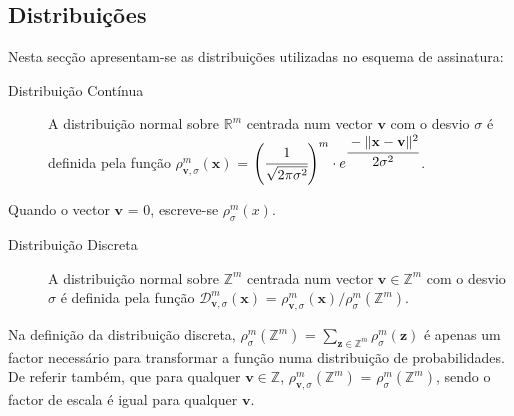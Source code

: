 \subsection{Distribuições}
Nesta secção apresentam-se as distribuições utilizadas no esquema de assinatura:
\begin{description}
    \item[Distribuição Contínua] A distribuição normal sobre $\mathbb{R}^m$ centrada num vector $\mathbf{v}$ com o desvio $\sigma$ é definida pela função $\rho_{\mathbf{v}, \sigma}^m(\mathbf{x})$ = $\left(\cfrac{1}{\sqrt{2\pi\sigma^2}}\right)^m \cdot e^{\cfrac{-\|\mathbf{x}-\mathbf{v}\|^2}{2\sigma^2}}$.  
\end{description}
Quando o vector $\mathbf{v}$ = $0$, escreve-se $\rho_{\sigma}^m(x)$.
\begin{description}  
   \item[Distribuição Discreta] A distribuição normal sobre $\mathbb{Z}^m$ centrada num vector $\mathbf{v} \in \mathbb{Z}^m$ com o desvio $\sigma$ é definida pela função $\mathcal{D}^m_{\mathbf{v}, \sigma}(\mathbf{x})$ = $\rho_{\mathbf{v}, \sigma}^m(\mathbf{x}) / \rho_\sigma^m(\mathbb{Z}^m)$.
\end{description}
Na definição da distribuição discreta, $\rho_\sigma^m(\mathbb{Z}^m)$ = $\sum_{\mathbf{z} \in \mathbb{Z}^m} \rho_{\sigma}^m(\mathbf{z})$ é apenas um factor necessário para transformar a função numa distribuição de probabilidades. De referir também, que para qualquer $\mathbf{v} \in \mathbb{Z}$, $\rho_{\mathbf{v},\sigma}^m(\mathbb{Z}^m)$ = $\rho_\sigma^m(\mathbb{Z}^m)$, sendo o factor de escala é igual para qualquer $\mathbf{v}$.
